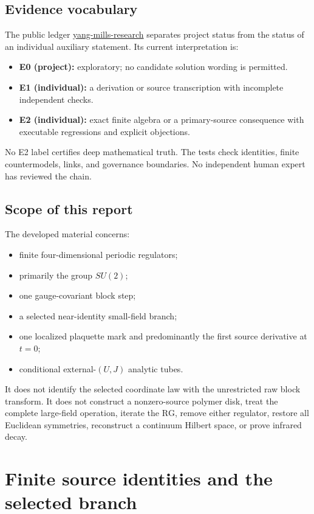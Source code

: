 \documentclass[11pt]{article}
\theoremstyle{definition}
\newcommand{\RG}{\mathrm{RG}}
\newcommand{\repo}{\href{https://github.com/YesterdaysLemon/yang-mills-research}
  {yang-mills-research}}
\begin{document}
\subsection{Evidence vocabulary}

The public ledger \repo{} separates project status from the status of an
individual auxiliary statement.  Its current interpretation is:
\begin{itemize}
  \item \textbf{E0 (project):} exploratory; no candidate solution wording is
  permitted.
  \item \textbf{E1 (individual):} a derivation or source transcription with
  incomplete independent checks.
  \item \textbf{E2 (individual):} exact finite algebra or a primary-source
  consequence with executable regressions and explicit objections.
\end{itemize}
No E2 label certifies deep mathematical truth.  The tests check identities,
finite countermodels, links, and governance boundaries.  No independent
human expert has reviewed the chain.

\subsection{Scope of this report}

The developed material concerns:
\begin{itemize}
  \item finite four-dimensional periodic regulators;
  \item primarily the group \(SU(2)\);
  \item one gauge-covariant block step;
  \item a selected near-identity small-field branch;
  \item one localized plaquette mark and predominantly the first source
  derivative at \(t=0\);
  \item conditional external-\((U,J)\) analytic tubes.
\end{itemize}
It does not identify the selected coordinate law with the unrestricted raw
block transform.  It does not construct a nonzero-source polymer disk, treat
the complete large-field operation, iterate the \(\RG\), remove either
regulator, restore all Euclidean symmetries, reconstruct a continuum
Hilbert space, or prove infrared decay.

\section{Finite source identities and the selected branch}
\end{document}
